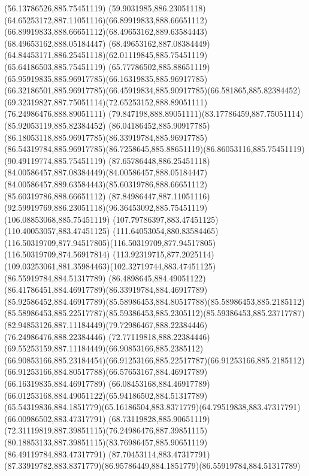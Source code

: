 {{		\lineto(56.13786526,885.75451119)
		\curveto(59.9031985,886.23051118)(64.65253172,887.11051116)(66.89919833,888.66651112)
		\curveto(66.89919833,888.66651112)(68.49653162,889.63584443)(68.49653162,888.05184447)
		\curveto(68.49653162,887.08384449)(64.84453171,886.25451118)(62.01119845,885.75451119)
		\lineto(65.64186503,885.75451119)
		\curveto(65.77786502,885.88651119)(65.95919835,885.96917785)(66.16319835,885.96917785)
		\curveto(66.32186501,885.96917785)(66.45919834,885.90917785)(66.581865,885.82384452)
		\curveto(69.32319827,887.75051114)(72.65253152,888.89051111)(76.24986476,888.89051111)
		\curveto(79.847198,888.89051111)(83.17786459,887.75051114)(85.92053119,885.82384452)
		\curveto(86.04186452,885.90917785)(86.18053118,885.96917785)(86.33919784,885.96917785)
		\curveto(86.54319784,885.96917785)(86.7258645,885.88651119)(86.86053116,885.75451119)
		\lineto(90.49119774,885.75451119)
		\curveto(87.65786448,886.25451118)(84.00586457,887.08384449)(84.00586457,888.05184447)
		\curveto(84.00586457,889.63584443)(85.60319786,888.66651112)(85.60319786,888.66651112)
		\curveto(87.84986447,887.11051116)(92.59919769,886.23051118)(96.36453092,885.75451119)
		\lineto(106.08853068,885.75451119)
		\lineto(107.79786397,883.47451125)
		\lineto(110.40053057,883.47451125)
		\curveto(111.64053054,880.83584465)(116.50319709,877.94517805)(116.50319709,877.94517805)
		\lineto(116.50319709,874.56917814)
		\curveto(113.92319715,877.2025114)(109.03253061,881.35984463)(102.32719744,883.47451125)
		\moveto(86.55919784,884.51317789)
		\curveto(86.4898645,884.49051122)(86.41786451,884.46917789)(86.33919784,884.46917789)
		\curveto(85.92586452,884.46917789)(85.58986453,884.80517788)(85.58986453,885.2185112)
		\curveto(85.58986453,885.22517787)(85.59386453,885.2305112)(85.59386453,885.23717787)
		\curveto(82.94853126,887.11184449)(79.72986467,888.22384446)(76.24986476,888.22384446)
		\curveto(72.77119818,888.22384446)(69.55253159,887.11184449)(66.90853166,885.2385112)
		\curveto(66.90853166,885.23184454)(66.91253166,885.22517787)(66.91253166,885.2185112)
		\curveto(66.91253166,884.80517788)(66.57653167,884.46917789)(66.16319835,884.46917789)
		\curveto(66.08453168,884.46917789)(66.01253168,884.49051122)(65.94186502,884.51317789)
		\curveto(65.54319836,884.1851779)(65.16186504,883.8371779)(64.79519838,883.47317791)
		\lineto(66.00986502,883.47317791)
		\curveto(68.73119828,885.90651119)(72.31119819,887.39851115)(76.24986476,887.39851115)
		\curveto(80.18853133,887.39851115)(83.76986457,885.90651119)(86.49119784,883.47317791)
		\lineto(87.70453114,883.47317791)
		\curveto(87.33919782,883.8371779)(86.95786449,884.1851779)(86.55919784,884.51317789)
}}
